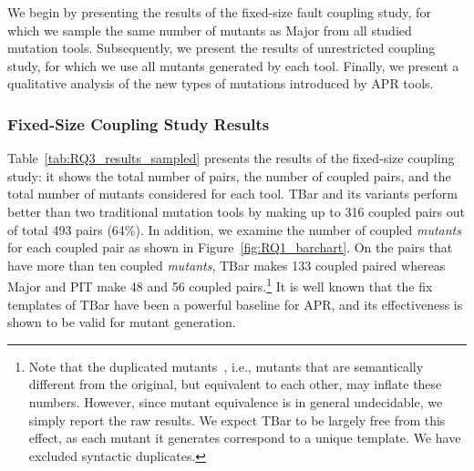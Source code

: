 \documentclass[conference]{IEEEtran}
\def\d4j{Defects4J\xspace}
\begin{document}

We begin by presenting the results of the fixed-size fault coupling study, for 
which we sample the same number of mutants as Major from all studied mutation 
tools. Subsequently, we present the results of unrestricted coupling study, for 
which we use all mutants generated by each tool. Finally, we present a 
qualitative analysis of the new types of mutations introduced by APR 
tools.

\subsubsection{Fixed-Size Coupling Study Results}

Table~\ref{tab:RQ3_results_sampled} presents the results of the fixed-size
coupling study: it shows the total number of pairs, the number of coupled pairs,
and the total number of mutants considered for each tool. TBar and its variants
perform better than two traditional mutation tools by making up to 316 coupled
pairs out of total 493 pairs (64\%). In addition, we examine the number of
coupled \emph{mutants} for each coupled pair as shown in
Figure~\ref{fig:RQ1_barchart}. On the pairs that have more than ten coupled
\emph{mutants}, TBar makes 133 coupled paired whereas Major and PIT make 48 and
56 coupled pairs.\footnote{Note that the duplicated
mutants~\cite{kintis2017detecting}, i.e., mutants that are semantically
different from the original, but equivalent to each other, may inflate these
numbers. However, since mutant equivalence is in general undecidable, we simply
report the raw results. We expect TBar to be largely free from this effect, as
each mutant it generates correspond to a unique template. We have excluded
syntactic duplicates.} It is well known that the fix templates of TBar have been
a powerful baseline for APR, and its effectiveness is shown to be valid for
mutant generation.

\end{document}
